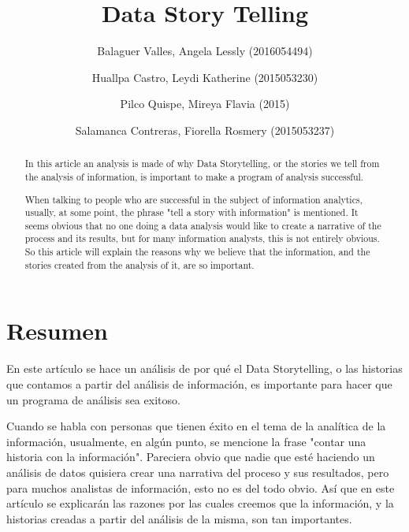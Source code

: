 \documentclass[preprint,12pt]{elsarticle}
\begin{document}
	
	\begin{frontmatter}
		
		
		\title{\huge Data Story Telling}
		
		\author{Balaguer Valles, Angela Lessly               (2016054494)}
		\author{Huallpa Castro, Leydi Katherine	      (2015053230)}
		\author{Pilco Quispe, Mireya Flavia		      (2015)}
		\author{Salamanca Contreras, Fiorella Rosmery (2015053237)}
		
		\address{Tacna, Perú}
		
		\begin{abstract}
			In this article an analysis is made of why Data Storytelling, or the stories we tell from the analysis of information, is important to make a program of analysis successful.

When talking to people who are successful in the subject of information analytics, usually, at some point, the phrase "tell a story with information" is mentioned. It seems obvious that no one doing a data analysis would like to create a narrative of the process and its results, but for many information analysts, this is not entirely obvious. So this article will explain the reasons why we believe that the information, and the stories created from the analysis of it, are so important.
	
		\end{abstract}
\end{frontmatter}
	
	\section{Resumen}
		En este artículo se hace un análisis de por qué el Data Storytelling, o las historias que contamos a partir del análisis de información, es importante para hacer que un programa de análisis sea exitoso. 

Cuando se habla con personas que tienen éxito en el tema de la analítica de la información, usualmente, en algún punto, se mencione la frase "contar una historia con la información". Pareciera obvio que nadie que esté haciendo un análisis de datos quisiera crear una narrativa del proceso y sus resultados, pero para muchos analistas de información, esto no es del todo obvio. Así que en este artículo se explicarán las razones por las cuales creemos que la información, y la historias creadas a partir del análisis de la misma, son tan importantes.\\
\end{document}
